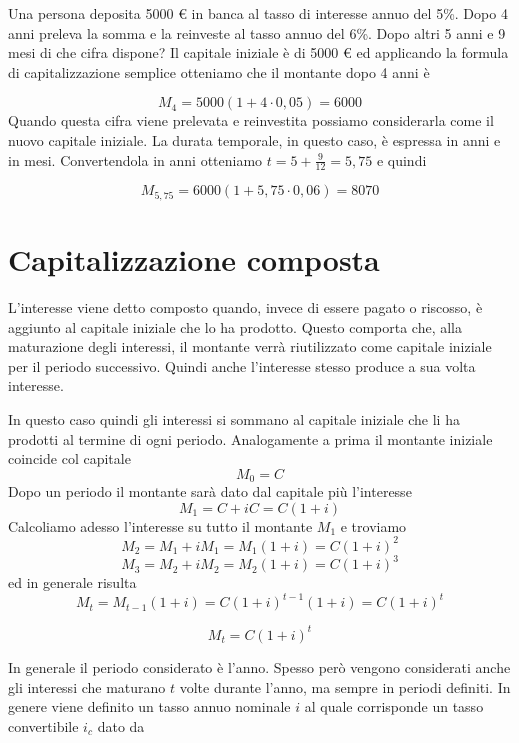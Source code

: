 \begin{exrig}
\begin{esempio}
Una persona deposita 5000 € in banca al tasso di interesse annuo del 5\%. 
Dopo 4 anni preleva la somma e la reinveste al tasso annuo del 6\%. Dopo 
altri 5 anni e 9 mesi di che cifra dispone?
Il capitale iniziale è di 5000 € ed applicando la formula di 
capitalizzazione semplice otteniamo che il montante dopo 4 anni è

\[M_4 = 5000(1+4\cdot0,05) = 6000\]
Quando questa cifra viene prelevata e reinvestita possiamo considerarla 
come il nuovo capitale iniziale. La durata temporale, in questo caso, è 
espressa in anni e in mesi. Convertendola in anni otteniamo 
\(t = 5 +\frac{9}{12} = 5,75\) e quindi

\[M_{5,75} = 6000(1+5,75\cdot0,06) = 8070\]
\end{esempio}
\end{exrig}

\section{Capitalizzazione composta}

L'interesse viene detto composto quando, invece di essere pagato o 
riscosso, è aggiunto al capitale iniziale che lo ha prodotto. Questo 
comporta che, alla maturazione degli interessi, il montante verrà 
riutilizzato come capitale iniziale per il periodo successivo. Quindi anche 
l'interesse stesso produce a sua volta interesse.

In questo caso quindi gli interessi si sommano al capitale iniziale che li 
ha prodotti al termine di ogni periodo.
Analogamente a prima il montante iniziale coincide col capitale
\[ M_{0}=C \]
Dopo un periodo il montante sarà dato dal capitale più l'interesse
\[M_{1}=C+iC=C(1+i)\]
Calcoliamo adesso l'interesse su tutto il montante \(M_1\) e troviamo
\[M_{2}=M_1+iM_1=M_1(1+i)=C(1+i)^2\]
\[M_{3}=M_2+iM_2=M_2(1+i)=C(1+i)^3\]
ed in generale risulta
\[M_{t}=M_{t-1}(1+i) = C(1+i)^{t-1}(1+i)=C(1+i)^{t}\]

\begin{definizione}
\[ M_{t}=C(1+i)^t \]
\end{definizione}

In generale il periodo considerato è l'anno. Spesso però vengono 
considerati anche gli interessi che maturano \(t\) volte durante l'anno, ma 
sempre in periodi definiti. 
In genere viene definito un tasso annuo nominale \(i\) al quale corrisponde 
un tasso convertibile \(i_c\) dato da

